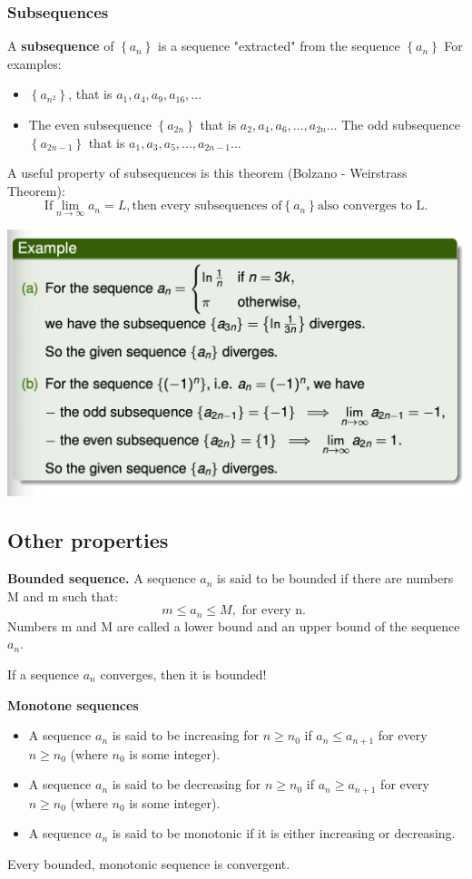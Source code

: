\documentclass{article}
\begin{document}
\subsubsection{Subsequences}
A \textbf{subsequence} of $\left\{a_n \right\}$ is a sequence "extracted" from the sequence $\left\{a_n \right\}$
For examples:
\begin{itemize}
    \item $\left\{a_{n^2} \right\}$, that is $a_1, a_4, a_9, a_{16},...$
    \item The even subsequence $\left\{a_{2n} \right\}$ that is $a_2, a_4, a_6,..., a_{2n}...$
    The odd subsequence $\left\{a_{2n-1} \right\}$ that is $a_1, a_3, a_5,..., a_{2n-1}...$
\end{itemize} A useful property of subsequences is this theorem (Bolzano - Weirstrass Theorem): \textbf{$$ \text{If} \lim_{n\to\infty} a_n = L, \text{then every subsequences of} \left\{a_n \right\} \text{also converges to L.} $$}
\begin{center}
    \includegraphics[scale = 0.6] {Screenshot 2023-12-06 at 4.17.38 PM.png}
\end{center}
\subsection{Other properties}
\textbf{Bounded sequence.} A sequence ${a_n}$ is said to be bounded if there are numbers M and m such that: 
$$ m \leq a_n \leq M, \text{ for every n. }$$
Numbers m and M are called a lower bound and an upper bound of the sequence $a_n.$
\begin{mdframed}
If a sequence $a_n$ converges, then it is bounded!
\end{mdframed}
\textbf{Monotone sequences}
\begin{itemize}
    \item A sequence $a_n$ is said to be increasing for $n\geq n_0$ if $a_n \leq a_{n+1} $ for every $n \geq n_0$ (where $n_0$ is some integer).
    \item  A sequence $a_n$ is said to be decreasing for $n\geq n_0$ if $a_n \geq a_{n+1} $ for every $n \geq n_0$ (where $n_0$ is some integer).
    \item A sequence $a_n$ is said to be monotonic if it is either increasing or decreasing. 
\end{itemize}
\begin{mdframed}
Every bounded, monotonic sequence is convergent.
\end{mdframed}
\end{document}

